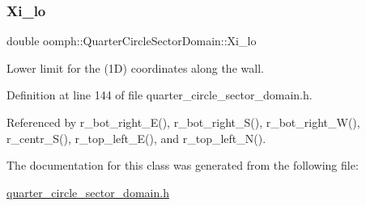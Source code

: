 \mbox{\label{classoomph_1_1QuarterCircleSectorDomain_afed5ccc21ccf6c6cd1dca65d58a5b708}} 
\subsubsection{\texorpdfstring{Xi\+\_\+lo}{Xi\_lo}}
{\footnotesize\ttfamily double oomph\+::\+Quarter\+Circle\+Sector\+Domain\+::\+Xi\+\_\+lo\hspace{0.3cm}{\ttfamily [private]}}



Lower limit for the (1D) coordinates along the wall. 



Definition at line 144 of file quarter\+\_\+circle\+\_\+sector\+\_\+domain.\+h.



Referenced by r\+\_\+bot\+\_\+right\+\_\+\+E(), r\+\_\+bot\+\_\+right\+\_\+\+S(), r\+\_\+bot\+\_\+right\+\_\+\+W(), r\+\_\+centr\+\_\+\+S(), r\+\_\+top\+\_\+left\+\_\+\+E(), and r\+\_\+top\+\_\+left\+\_\+\+N().



The documentation for this class was generated from the following file\+:\begin{DoxyCompactItemize}
\item 
\hyperlink{quarter__circle__sector__domain_8h}{quarter\+\_\+circle\+\_\+sector\+\_\+domain.\+h}\end{DoxyCompactItemize}
